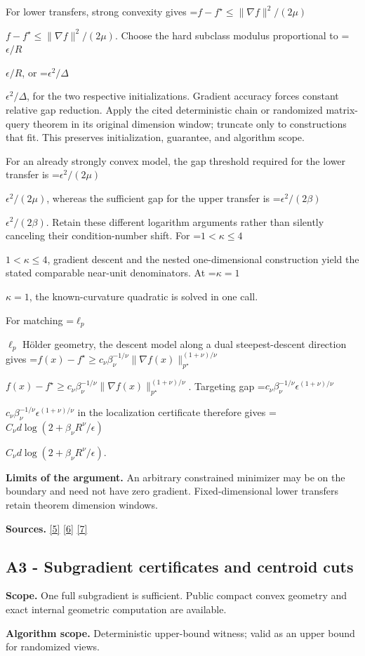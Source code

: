 \documentclass[10pt,a4paper]{article}
\newcommand{\AtlasMath}[1]{\par\begingroup\centering\setbox0=\hbox{$\displaystyle #1$}\ifdim\wd0>1.4\linewidth\typeout{ATLAS WIDE FORMULA: \the\wd0}\fi\ifdim\wd0>\linewidth\resizebox{\linewidth}{!}{\box0}\else\box0\fi\par\endgroup}
\newcommand{\AtlasInlineMath}[1]{\begingroup\setbox0=\hbox{$#1$}\ifdim\wd0>.4\linewidth\endgroup\AtlasMath{#1}\else\endgroup$#1$\fi}
\begin{document}
For lower transfers, strong convexity gives \AtlasInlineMath{f-f^\star\le\|\nabla f\|^2/(2\mu)}. Choose the hard subclass modulus proportional to \AtlasInlineMath{\epsilon/R}, or \AtlasInlineMath{\epsilon^2/\Delta}, for the two respective initializations. Gradient accuracy forces constant relative gap reduction. Apply the cited deterministic chain or randomized matrix-query theorem in its original dimension window; truncate only to constructions that fit. This preserves initialization, guarantee, and algorithm scope.

For an already strongly convex model, the gap threshold required for the lower transfer is \AtlasInlineMath{\epsilon^2/(2\mu)}, whereas the sufficient gap for the upper transfer is \AtlasInlineMath{\epsilon^2/(2\beta)}. Retain these different logarithm arguments rather than silently canceling their condition-number shift. For \AtlasInlineMath{1<\kappa\le4}, gradient descent and the nested one-dimensional construction yield the stated comparable near-unit denominators. At \AtlasInlineMath{\kappa=1}, the known-curvature quadratic is solved in one call.

For matching \AtlasInlineMath{\ell_p} Hölder geometry, the descent model along a dual steepest-descent direction gives
\AtlasInlineMath{f(x)-f^\star\ge c_\nu\beta_\nu^{-1/\nu}\|\nabla f(x)\|_{p^\star}^{(1+\nu)/\nu}}.
Targeting gap \AtlasInlineMath{c_\nu\beta_\nu^{-1/\nu}\epsilon^{(1+\nu)/\nu}} in the localization certificate therefore gives
\AtlasInlineMath{C_\nu d\log(2+\beta_\nu R^\nu/\epsilon)}.

\textbf{Limits of the argument.} An arbitrary constrained minimizer may be on the boundary and need not have zero gradient. Fixed-dimensional lower transfers retain theorem dimension windows.

\textbf{Sources.} \href{https://arxiv.org/pdf/2101.09740v2}{[5]} \href{https://arxiv.org/pdf/2609.33360v2}{[6]} \href{https://arxiv.org/pdf/2609.10874}{[7]}

\subsection{A3 - Subgradient certificates and centroid cuts}
\textbf{Scope.} One full subgradient is sufficient. Public compact convex geometry and exact internal geometric computation are available.

\textbf{Algorithm scope.} Deterministic upper-bound witness; valid as an upper bound for randomized views.
\end{document}
